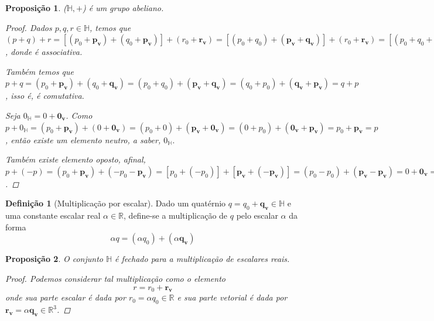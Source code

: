 \documentclass[a4paper,12pt]{report}
\theoremstyle{plain}
\newtheorem{proposicao}{Proposição}[section]
\theoremstyle{definition}
\newtheorem{definicao}{Definição}[section]
\begin{document}
	\begin{proposicao}
		($\mathbb{H},+$) é um grupo abeliano.
		\begin{proof}
			Dados $p,q,r \in \mathbb{H}$, temos que
			$(p+q)+r=[(p_0+\mathbf{p_v})+(q_0+\mathbf{p_v})]+(r_0+\mathbf{r_v})=[(p_0+q_0)+(\mathbf{p_v}+\mathbf{q_v})]+(r_0+\mathbf{r_v})=[(p_0+q_0+r_0)+(\mathbf{p_v}+\mathbf{q_v}+\mathbf{r_v})]=[(p_0+q_0+r_0)+(\mathbf{p_v}+\mathbf{q_v}+\mathbf{r_v})]=\{[p_0+(q_0+r_0)]+[\mathbf{p_v}+(\mathbf{q_v}+\mathbf{r_v})]\}=(p_0+\mathbf{p_v})+[(q_0+r_0)+(\mathbf{q_v}+\mathbf{r_v})]=(p_0+\mathbf{p_v})+[(q_0+\mathbf{q_v})+(r_0+\mathbf{r_v})]=p+(q+r)$, donde é associativa.
			
			Também temos que $p+q=(p_0+\mathbf{p_v})+(q_0+\mathbf{q_v})=(p_0+q_0)+(\mathbf{p_v}+\mathbf{q_v})=(q_0+p_0)+(\mathbf{q_v}+\mathbf{p_v})=q+p$, isso é, é comutativa.
			
			Seja $0_{\mathbb{H}}=0+\mathbf{0_v}$. Como $p+0_{\mathbb{H}}=(p_0+\mathbf{p_v})+(0+\mathbf{0_v})=(p_0+0)+(\mathbf{p_v}+\mathbf{0_v})=(0+p_0)+(\mathbf{0_v}+\mathbf{p_v})=p_0+\mathbf{p_v}=p$, então existe um elemento neutro, a saber, $0_{\mathbb{H}}$.
			
			Também existe elemento oposto, afinal, $p+(-p)= (p_0+\mathbf{p_v})+(-p_0-\mathbf{p_v})=[p_0+(-p_0)]+[\mathbf{p_v}+(\mathbf{-p_v})]=(p_0-p_0)+(\mathbf{p_v}-\mathbf{p_v})=0+\mathbf{0_v}=0_{\mathbb{H}}$.
		\end{proof}
	\end{proposicao}
	
	\begin{definicao}[Multiplicação por escalar]
		Dado um quatérnio $q=q_0+\mathbf{q_v} \in \mathbb{H}$ e uma constante escalar real $\alpha \in \mathbb{R}$, define-se a multiplicação de $q$ pelo escalar $\alpha$ da forma
		$$\alpha q=(\alpha q_0)+(\alpha \mathbf{q_v})$$
	\end{definicao}
	
	\begin{proposicao}
		O conjunto $\mathbb{H}$ é fechado para a multiplicação de escalares reais.
		\begin{proof}
			Podemos considerar tal multiplicação como o elemento 
			\begin{equation*}
				r=r_0+\mathbf{r_v}
			\end{equation*}
			onde sua parte escalar é dada por $r_0=\alpha q_0 \in \mathbb{R}$ e sua parte vetorial é dada por $\mathbf{r_v}=\alpha \mathbf{q_v} \in \mathbb{R}^3$.
		\end{proof}
	\end{proposicao}
	
\end{document}
